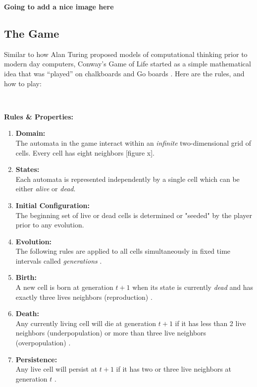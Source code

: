 \documentclass{article}
\theoremstyle{definition}
\theoremstyle{plain}
\theoremstyle{plain}
\begin{document}
\textbf{Going to add a nice image here}

\subsection{The Game}
Similar to how Alan Turing proposed models of computational thinking prior to modern day computers, Conway's Game of Life started as a simple mathematical idea that was “played” on chalkboards and Go boards \cite{Izhikevich_Conway_Seth}. Here are the rules, and how to play: 

\

\textbf{Rules \& Properties: }
\begin{enumerate}

  \item \textbf{Domain: }\\ The automata in the game interact within an \textit{infinite} two-dimensional grid of cells. Every cell has eight neighbors \cite{Izhikevich_Conway_Seth}[figure x].

  \item \textbf{States: }\\ Each automata is represented independently by a single cell which can be either \textit{alive} or \textit{dead}.

  \item \textbf{Initial Configuration: } \\ The beginning set of live or dead cells is determined or "seeded" by the player prior to any evolution.

  \item \textbf{Evolution: } \\ The following rules are applied to all cells simultaneously in fixed time intervals called \textit{generations} \cite{Bontes2019}.

  \item \textbf{Birth: } \\ A new cell is born at generation $t + 1$ when its state is currently \textit{dead} and has exactly three lives neighbors (reproduction) \cite{Bontes2019}.

  \item \textbf{Death: } \\ Any currently living cell will die at generation $t + 1$ if it has less than 2 live neighbors (underpopulation) or more than three live neighbors (overpopulation) \cite{Bontes2019}.

  \item \textbf{Persistence: } \\ Any live cell will persist at $t + 1$ if it has two or three live neighbors at generation $t$ \cite{Izhikevich_Conway_Seth}.
\end{enumerate}
\end{document}
